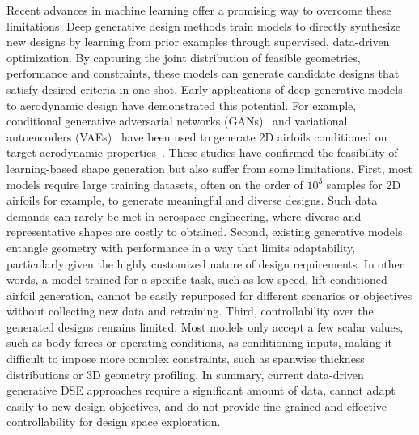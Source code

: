 Recent advances in machine learning offer a promising way to overcome these limitations. Deep generative design methods train models to directly synthesize new designs by learning from prior examples through supervised, data-driven optimization. By capturing the joint distribution of feasible geometries, performance and constraints, these models can generate candidate designs that satisfy desired criteria in one shot. Early applications of deep generative models to aerodynamic design have demonstrated this potential. For example, conditional generative adversarial networks (GANs)~\cite{ai.Goodfellow2020} and variational autoencoders (VAEs)~\cite{ai.Kingma2015} have been used to generate 2D airfoils conditioned on target aerodynamic properties~\cite{aa.Chen2020,aa.Li2020,aa.Li2021,aa.Du2020,aa.Achour2020,aa.Wang2022,aa.Lei2021,aa.Yonekura2021,aa.Kou2023,aa.Swannet2024}. These studies have confirmed the feasibility of learning-based shape generation but also suffer from some limitations.  First, most models require large training datasets, often on the order of $10^3$ samples for 2D airfoils for example, to generate meaningful and diverse designs. Such data demands can rarely be met in aerospace engineering, where diverse and representative shapes are costly to obtained. Second, existing generative models entangle geometry with performance in a way that limits adaptability, particularly given the highly customized nature of design requirements. In other words, a model trained for a specific task, such as low-speed, lift-conditioned airfoil generation, cannot be easily repurposed for different scenarios or objectives without collecting new data and retraining. Third, controllability over the generated designs remains limited. Most models only accept a few scalar values, such as  body forces or operating conditions, as conditioning inputs, making it difficult to impose more complex constraints, such as spanwise thickness distributions or 3D geometry profiling. In summary, current data-driven generative DSE approaches require a significant amount of data, cannot adapt easily to new design objectives, and do not provide fine-grained and effective controllability for design space exploration.

